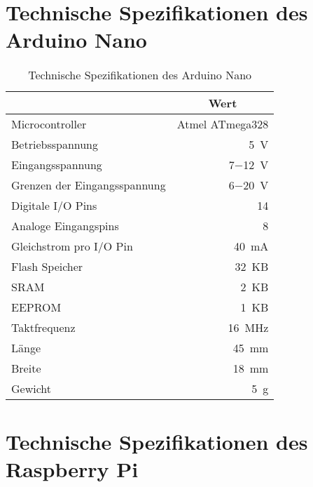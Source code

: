 \clearpage{}

\section{Technische Spezifikationen des Arduino Nano}
\label{app:arduino}

\begin{table}[ht]
\begin{center}
\begin{tabular}{|l|r|}
\hline
\rowcolor{lightgray} \multicolumn{1}{|c|}{\textbf{Spezifikation}} & \multicolumn{1}{|c|}{\textbf{Wert}}\\
\hline
Microcontroller & Atmel ATmega328\\
\hline
Betriebsspannung & \SI{5}{\volt}\\
\hline
Eingangsspannung & \SI{7}{}$-$\SI{12}{\volt}\\
\hline
Grenzen der Eingangsspannung & \SI{6}{}$-$\SI{20}{\volt}\\
\hline
Digitale I/O Pins & \SI{14}{}\\
\hline
Analoge Eingangspins & \SI{8}{}\\
\hline
Gleichstrom pro I/O Pin & \SI{40}{\milli\ampere}\\
\hline
Flash Speicher & \SI{32}{KB}\\
\hline
SRAM & \SI{2}{KB} \\
\hline
EEPROM & \SI{1}{KB}\\
\hline
Taktfrequenz & \SI{16}{\mega\Hz}\\
\hline
Länge & \SI{45}{\milli\meter}\\
\hline
Breite & \SI{18}{\milli\meter}\\
\hline
Gewicht & \SI{5}{\gram}\\
\hline
\end{tabular}
\caption{Technische Spezifikationen des Arduino Nano}
\end{center}
\label{tab:arduino}
\end{table}

\clearpage{}

\section{Technische Spezifikationen des Raspberry Pi}
\label{app:raspberry}

